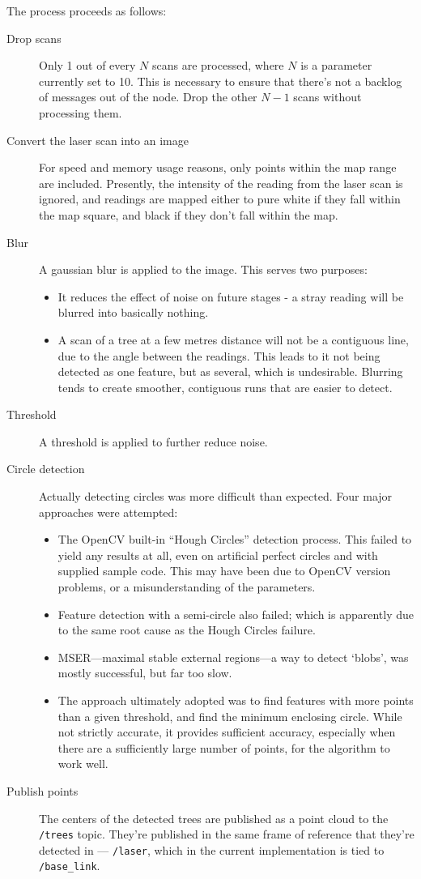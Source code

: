 \documentclass[12pt,oneside,a4paper,draft]{book}
\begin{document}
The process proceeds as follows:
\begin{description}
\item[Drop scans] Only 1 out of every $N$ scans are processed, where
  $N$ is a parameter currently set to 10. This is necessary to ensure
  that there's not a backlog of messages out of the node. Drop the
  other $N-1$ scans without processing them.
\item[Convert the laser scan into an image] For speed and memory usage
  reasons, only points within the map range are included. Presently,
  the intensity of the reading from the laser scan is ignored, and
  readings are mapped either to pure white if they fall within the map
  square, and black if they don't fall within the map.
\item[Blur] A gaussian blur is applied to the image. This serves two
  purposes:
  \begin{itemize}
  \item It reduces the effect of noise on future stages - a stray
    reading will be blurred into basically nothing.
  \item A scan of a tree at a few metres distance will not be a
    contiguous line, due to the angle between the readings. This leads
    to it not being detected as one feature, but as several, which is
    undesirable. Blurring tends to create smoother, contiguous runs
    that are easier to detect.
  \end{itemize}
\item[Threshold] A threshold is applied to further reduce noise.
\item[Circle detection] Actually detecting circles was more difficult
  than expected. Four major approaches were attempted:
  \begin{itemize}
  \item The OpenCV built-in ``Hough Circles'' detection process. This
    failed to yield any results at all, even on artificial perfect
    circles and with supplied sample code. This may have been due to
    OpenCV version problems, or a misunderstanding of the parameters.
  \item Feature detection with a semi-circle also failed; which is
    apparently due to the same root cause as the Hough Circles
    failure.
  \item MSER---maximal stable external regions---a way to detect
    `blobs', was mostly successful, but far too slow.
  \item The approach ultimately adopted was to find features with more
    points than a given threshold, and find the minimum enclosing
    circle. While not strictly accurate, it provides sufficient
    accuracy, especially when there are a sufficiently large number of
    points, for the algorithm to work well.
  \end{itemize}
\item[Publish points] The centers of the detected trees are published
  as a point cloud to the \texttt{/trees} topic. They're published in
  the same frame of reference that they're detected in ---
  \texttt{/laser}, which in the current implementation is tied to
  \texttt{/base\_link}.
\end{description}
\end{document}

